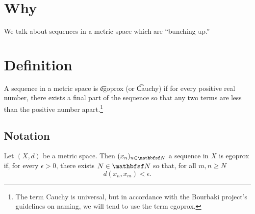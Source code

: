 

\section*{Why}

We talk about sequences in a metric space which are ``bunching up.''

\section*{Definition}

A sequence in a metric space is \t{egoprox} (or \t{Cauchy}) if for every positive real number, there exists a final part of the sequence so that any two terms are less than the positive number apart.\footnote{The term Cauchy is universal, but in accordance with the Bourbaki project's guidelines on naming, we will tend to use the term egoprox.}

\subsection*{Notation}

Let $(X, d)$ be a metric space.
Then $(x_n)_{n \in \N  }$ a sequence in $X$ is egoprox if, for every $\epsilon  > 0$, there exists $N \in \N  $ so that, for all $m, n \geq N$
\[
d(x_n, x_m) < \epsilon .
\]

\blankpage